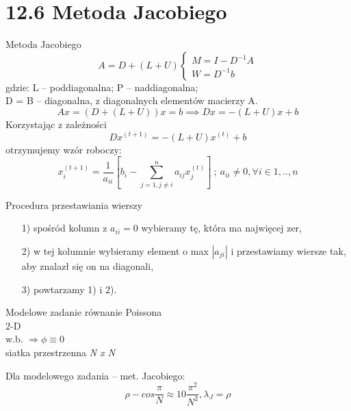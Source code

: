 \section{12.6 Metoda Jacobiego}

\begin{frame}{Metoda Jacobiego}
  $$
  A = D + (L+U)
  \begin{cases}
  M=I-D^{-1}A\\
  W=D^{-1}b
  \end{cases}
  $$
  gdzie: L -- poddiagonalna; P -- naddiagonalna;\\
  D = B -- diagonalna, z diagonalnych elementów macierzy A.
  $$Ax = (D+(L+U))x = b \implies Dx = -(L+U)x + b$$
  Korzystając z zależności
  $$\boxed{Dx^{(t+1)}= -(L+U)x^{(t)}+b}$$
  otrzymujemy wzór roboczy:
  $$x_i^{(t+1)}=\frac{1}{a_{ii}}[b_i-\sum_{j=1,j\neq i}^{n} a_{ij}x_j^{(t)}]\  ;\  a_{ii} \neq 0, \forall i \in {1,..,n} $$
\end{frame}

\begin{frame}
  \begin{block}{Procedura przestawiania wierszy}
    \begin{itemize}
      \item[1)] spośród kolumn z $a_{ii} = 0$ wybieramy tę, która ma najwięcej zer,
      \item[2)] w tej kolumnie wybieramy element o max $|a_{ji}|$ i przestawiamy wiersze tak, aby znalazł się on na diagonali,
      \item[3)] powtarzamy 1) i 2).
    \end{itemize}
  \end{block}
\end{frame}

\begin{frame}{}
  \begin{block}{Modelowe zadanie}
    równanie Poissona
    \\2-D
    \\w.b. $\Rightarrow\phi\equiv 0$
    \\siatka przestrzenna \emph{N x N}
  \end{block}

  \begin{block}{Dla modelowego zadania -- met. Jacobiego:}  %
    $$\rho - cos\frac{\pi}{N}\approx 1 0 \frac{\pi^2}{N^2}, \lambda _J = \rho$$
  \end{block}
\end{frame}


